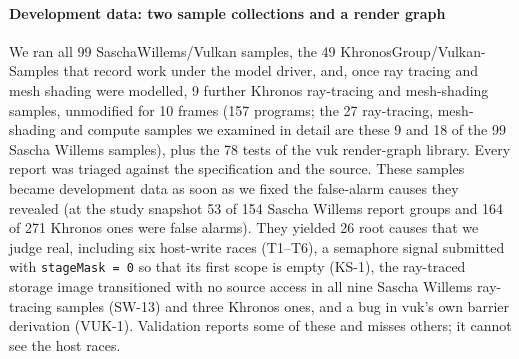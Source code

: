 \documentclass[acmtog,anonymous,review]{acmart}
\newcommand{\code}[1]{\texttt{#1}}
\begin{document}
\paragraph{Development data: two sample collections and a render graph}
We ran all 99 SaschaWillems/Vulkan samples, the 49 Khronos\-Group/\-Vulkan-\-Samples that record work under the model
driver, and, once ray tracing and mesh shading were modelled, 9 further Khronos ray-tracing and mesh-shading samples,
unmodified for 10 frames (157 programs; the 27 ray-tracing, mesh-shading and compute samples we examined in detail are
these 9 and 18 of the 99 Sascha Willems samples), plus the 78 tests of the vuk render-graph library. Every report was
triaged against the specification and the source. These samples became development data as soon as we fixed the
false-alarm causes they revealed (at the study snapshot 53 of 154 Sascha Willems report groups and 164 of 271 Khronos
ones were false alarms). They yielded 26 root causes that we judge real, including six host-write races (T1--T6), a
semaphore signal submitted with \code{stageMask = 0} so that its first scope is empty (KS-1), the ray-traced storage
image transitioned with no source access in all nine Sascha Willems ray-tracing samples (SW-13) and three Khronos
ones, and a bug in vuk's own barrier derivation (VUK-1). Validation reports some of these and misses others; it cannot
see the host races.
\end{document}
